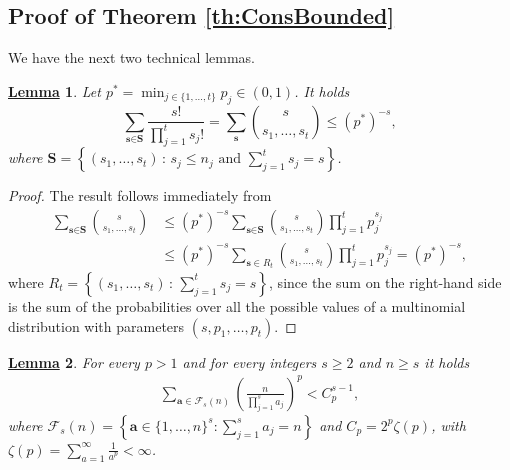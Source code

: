 \documentclass[12pt]{article}
\newtheorem{Lem}{\underline{\bf Lemma}}
\begin{document}
\subsection{Proof of Theorem \ref{th:ConsBounded}}
We have the next two technical lemmas.
\begin{Lem}\label{bound_sum}
Let $p^* = \min_{j \in \{1, \dots, t\}} p_j \in (0,1)$. It holds
\[
\sum_{\textbf{s} \in \textbf{S}}\frac{s!}{\prod_{j = 1}^ts_j!} = \sum_{\textbf{s}}\binom{s}{s_1, \dots, s_t} \leq (p^*)^{-s},
\]
where $\textbf{S} = \left\{(s_1, \dots, s_t) \, : \, s_j \leq n_j \text{ and } \sum_{j = 1}^ts_j = s \right\}$.
\end{Lem}
\begin{proof}
The result follows immediately from
\[
\begin{aligned}
\sum_{\textbf{s} \in \textbf{S}}\binom{s}{s_1, \dots, s_t} &\leq (p^*)^{-s}\sum_{\textbf{s} \in \textbf{S}}\binom{s}{s_1, \dots, s_t}\prod_{j = 1}^tp_j^{s_j}\\
& \leq (p^*)^{-s}\sum_{\textbf{s} \in R_t}\binom{s}{s_1, \dots, s_t}\prod_{j = 1}^tp_j^{s_j}= (p^*)^{-s},
\end{aligned}
\]
where $R_t = \left\{(s_1, \dots, s_t) \, : \, \sum_{j = 1}^ts_j = s \right\}$, since the sum on the right-hand side is the sum of the probabilities over all the possible values of a multinomial distribution with parameters $(s, p_1, \dots, p_t)$.
\end{proof}
\begin{Lem}\label{induction}
For every $p>1$ and for every integers $s\geq 2$ and $n\ge s$ it holds
\begin{align*}
\sum_{\bm{a} \in \mathcal{F}_s(n)} \left(\frac{n}{\prod_{j=1}^s a_j}\right)^p < C_p^{s-1},
\end{align*}
where $\mathcal{F}_s(n) = \left\{ \textbf{a} \in \{1,\ldots,n\}^s: \sum_{j = 1}^s a_j =n\right\}$
and  $C_p = 2^{p}\zeta(p)$, with $\zeta(p) = \sum_{a=1}^{\infty} \frac{1}{a^p}<\infty$.
\end{Lem}
\end{document}
